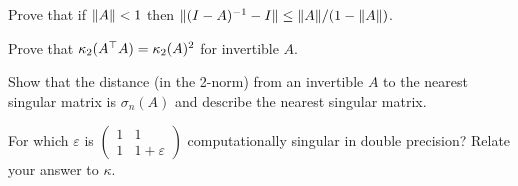 \begin{exercise}
Prove that if $\lVert A\rVert<1$ then $\lVert(I-A)^{-1}-I\rVert\le\lVert A\rVert/(1-\lVert A\rVert)$.
\end{exercise}

\begin{exercise}
Prove that $\kappa_2(A^{\top} A)=\kappa_2(A)^2$ for invertible $A$.
\end{exercise}

\begin{exercise}
Show that the distance (in the 2-norm) from an invertible $A$ to the nearest singular matrix is $\sigma_n(A)$ and describe the nearest singular matrix.
\end{exercise}

\begin{exercise}
For which $\varepsilon$ is $\begin{pmatrix}1&1\\1&1+\varepsilon\end{pmatrix}$ computationally singular in double precision? Relate your answer to $\kappa$.
\end{exercise}
